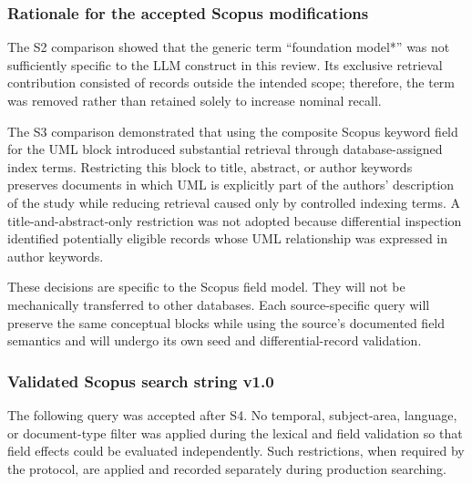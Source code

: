 \subsubsection{Rationale for the accepted Scopus modifications}

The S2 comparison showed that the generic term ``foundation model*'' was not
sufficiently specific to the LLM construct in this review. Its exclusive
retrieval contribution consisted of records outside the intended scope;
therefore, the term was removed rather than retained solely to increase
nominal recall.

The S3 comparison demonstrated that using the composite Scopus keyword field
for the UML block introduced substantial retrieval through database-assigned
index terms. Restricting this block to title, abstract, or author keywords
preserves documents in which UML is explicitly part of the authors'
description of the study while reducing retrieval caused only by controlled
indexing terms. A title-and-abstract-only restriction was not adopted because
differential inspection identified potentially eligible records whose UML
relationship was expressed in author keywords.

These decisions are specific to the Scopus field model. They will not be
mechanically transferred to other databases. Each source-specific query will
preserve the same conceptual blocks while using the source's documented field
semantics and will undergo its own seed and differential-record validation.

\subsubsection{Validated Scopus search string v1.0}

The following query was accepted after S4. No temporal, subject-area, language,
or document-type filter was applied during the lexical and field validation so
that field effects could be evaluated independently. Such restrictions, when
required by the protocol, are applied and recorded separately during production
searching.

